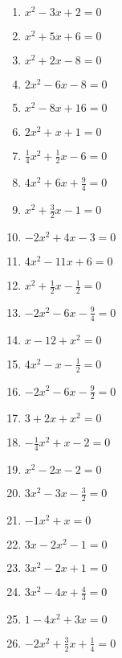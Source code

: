 \begin{Exercise}[title={Löse die folgenden Gleichungen}, label=mitternachtA1]\\
	\begin{minipage}{\textwidth}
		\begin{minipage}{0.49\textwidth}
			\begin{enumerate}[label=\alph*)]
				\item \(x^2-3x+2=0\)
				\item \(x^2+5x+6=0\)
				\item \(x^2+2x-8=0\)
				\item \(2x^2-6x-8=0\)
				\item \(x^2-8x+16=0\)
				\item \(2x^2+x+1=0\)
				\item \(\frac{1}{4}x^2+\frac{1}{2}x-6=0\)
				\item \(4x^2+6x+\frac{9}{4}=0\)
				\item \(x^2+\frac{3}{2}x-1=0\)
				\item \(-2x^2+4x-3=0\)
				\item \(4x^2-11x+6=0\)
				\item \(x^2+\frac{1}{2}x-\frac{1}{2}=0\)
				\item \(-2x^2-6x-\frac{9}{4}=0\)
			\end{enumerate}
		\end{minipage}
		\begin{minipage}{0.49\textwidth}
			\begin{enumerate}[label=\alph*)]
				\setcounter{enumi}{13}
				\item \(x-12+x^2=0\)
				\item \(4x^2-x-\frac{1}{2}=0\)
				\item \(-2x^2-6x-\frac{9}{2}=0\)
				\item \(3+2x+x^2=0\)
				\item \(-\frac{1}{4}x^2+x-2=0\)
				\item \(x^2-2x-2=0\)
				\item \(3x^2-3x-\frac{3}{2}=0\)
				\item \(-1x^2+x=0\)
				\item \(3x-2x^2-1=0\)
				\item \(3x^2-2x+1=0\)
				\item \(3x^2-4x+\frac{4}{3}=0\)
				\item \(1-4x^2+3x=0\)
				\item \(-2x^2+\frac{3}{2}x+\frac{1}{4}=0\)
			\end{enumerate}
		\end{minipage}
	\end{minipage}
\end{Exercise}
